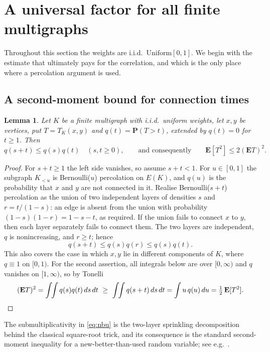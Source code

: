 \documentclass[11pt,a4paper]{amsart}
\theoremstyle{plain}
\newtheorem{lemma}[theorem]{Lemma}
\theoremstyle{definition}
\theoremstyle{remark}
\newcommand{\E}{\mathbf{E}}
\newcommand{\PP}{\mathbf{P}}
\begin{document}
\section{A universal factor for all finite multigraphs}
\label{sec:universal}

Throughout this section the weights are i.i.d.\ $\mathrm{Uniform}[0,1]$. We
begin with the estimate that ultimately pays for the correlation, and which is
the only place where a percolation argument is used.

\subsection{A second-moment bound for connection times}

\begin{lemma}
\label{lem:nbu}
Let $K$ be a finite multigraph with i.i.d.\ uniform weights, let $x,y$ be
vertices, put $T=T_K(x,y)$ and $q(t)=\PP(T>t)$, extended by $q(t)=0$ for
$t\ge1$. Then
\begin{equation}
\label{eq:nbu}
q(s+t)\le q(s)q(t)\quad(s,t\ge0),
\qquad\text{and consequently}\qquad
\E[T^2]\le2(\E T)^2 .
\end{equation}
\end{lemma}

\begin{proof}
For $s+t\ge1$ the left side vanishes, so assume $s+t<1$. For $u\in[0,1]$ the
subgraph $K_{<u}$ is Bernoulli($u$) percolation on $E(K)$, and $q(u)$ is the
probability that $x$ and $y$ are not connected in it. Realise Bernoulli($s+t$)
percolation as the union of two independent layers of densities $s$ and
$r=t/(1-s)$: an edge is absent from the union with probability
$(1-s)(1-r)=1-s-t$, as required. If the union fails to connect $x$ to $y$, then
each layer separately fails to connect them. The two layers are independent, $q$
is nonincreasing, and $r\ge t$; hence
\[
q(s+t)\le q(s)q(r)\le q(s)q(t).
\]
This also covers the case in which $x,y$ lie in different components of $K$,
where $q\equiv1$ on $[0,1)$. For the second assertion, all integrals below are
over $[0,\infty)$ and $q$ vanishes on $[1,\infty)$, so by Tonelli
\[
(\E T)^2=\int\!\!\int q(s)q(t)\,ds\,dt
\ \ge\ \int\!\!\int q(s+t)\,ds\,dt
=\int u\,q(u)\,du=\tfrac12\,\E[T^2] .\qedhere
\]
\end{proof}

The submultiplicativity in \eqref{eq:nbu} is the two-layer sprinkling
decomposition behind the classical square-root trick, and its consequence is the
standard second-moment inequality for a new-better-than-used random variable;
see e.g.\ \cite{BarlowProschan}.
\end{document}
